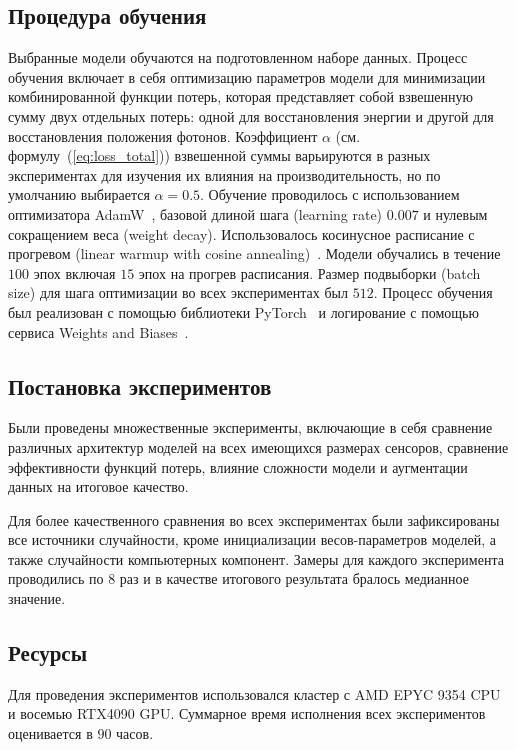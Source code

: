 \documentclass[a4paper,12pt]{extarticle}
\begin{document}
\subsection{Процедура обучения}

Выбранные модели обучаются на подготовленном наборе данных. Процесс обучения включает в себя оптимизацию параметров модели для минимизации комбинированной функции потерь, которая представляет собой взвешенную сумму двух отдельных потерь: одной для восстановления энергии и другой для восстановления положения фотонов. Коэффициент $\alpha$ (см. формулу~(\ref{eq:loss_total})) взвешенной суммы варьируются в разных экспериментах для изучения их влияния на производительность, но по умолчанию выбирается $\alpha = 0.5$. Обучение проводилось с использованием оптимизатора AdamW~\cite{loshchilov2019decoupled}, базовой длиной шага (learning rate) $0.007$ и нулевым сокращением веса (weight decay). Использовалось косинусное расписание с прогревом (linear warmup with cosine annealing)~\cite{dosovitskiy2021image}. Модели обучались в течение $100$ эпох включая $15$ эпох на прогрев расписания. Размер подвыборки (batch size) для шага оптимизации во всех экспериментах был $512$. Процесс обучения был реализован с помощью библиотеки PyTorch~\cite{paszke2019pytorch} и логирование с помощью сервиса Weights and Biases~\cite{wandb}.

\subsection{Постановка экспериментов}

Были проведены множественные эксперименты, включающие в себя сравнение различных архитектур моделей на всех имеющихся размерах сенсоров, сравнение эффективности функций потерь, влияние сложности модели и аугментации данных на итоговое качество.

Для более качественного сравнения во всех экспериментах были зафиксированы все источники случайности, кроме инициализации весов-параметров моделей, а также случайности компьютерных компонент. Замеры для каждого эксперимента проводились по $8$ раз и в качестве итогового результата бралось медианное значение.

\subsection{Ресурсы}

Для проведения экспериментов использовался кластер с AMD EPYC 9354 CPU и восемью RTX4090 GPU. Суммарное время исполнения всех экспериментов оценивается в $90$ часов.
\end{document}
